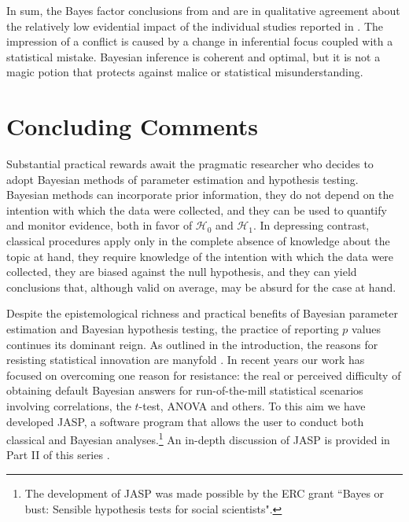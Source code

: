 In sum, the Bayes factor conclusions from  and  are in qualitative agreement about the relatively low evidential impact of the individual studies reported in . The impression of a conflict is caused by a change in inferential focus coupled with a statistical mistake. Bayesian inference is coherent and optimal, but it is not a magic potion that protects against malice or statistical misunderstanding.

\section{Concluding Comments}
Substantial practical rewards await the pragmatic researcher who decides to adopt Bayesian methods of parameter estimation and hypothesis testing. Bayesian methods can incorporate prior information, they do not depend on the intention with which the data were collected, and they can be used to quantify and monitor evidence, both in favor of $\mathcal{H}_0$ and $\mathcal{H}_1$. In depressing contrast, classical procedures apply only in the complete absence of knowledge about the topic at hand, they require knowledge of the intention with which the data were collected, they are biased against the null hypothesis, and they can yield conclusions that, although valid on average, may be absurd for the case at hand.

Despite the epistemological richness and practical benefits of Bayesian parameter estimation and Bayesian hypothesis testing, the practice of reporting $p$ values continues its dominant reign. As outlined in the introduction, the reasons for resisting statistical innovation are manyfold \cite{Sharpe2013}. In recent years our work has focused on overcoming one reason for resistance: the real or perceived difficulty of obtaining default Bayesian answers for run-of-the-mill statistical scenarios involving correlations, the $t$-test, ANOVA and others. To this aim we have developed JASP, a software program that allows the user to conduct both classical and Bayesian analyses.\footnote{The development of JASP was made possible by the ERC grant ``Bayes or bust: Sensible hypothesis tests for social scientists".} An in-depth discussion of JASP is provided in Part II of this series \cite{WagenmakersEtAlsubmPBRPartII}.





